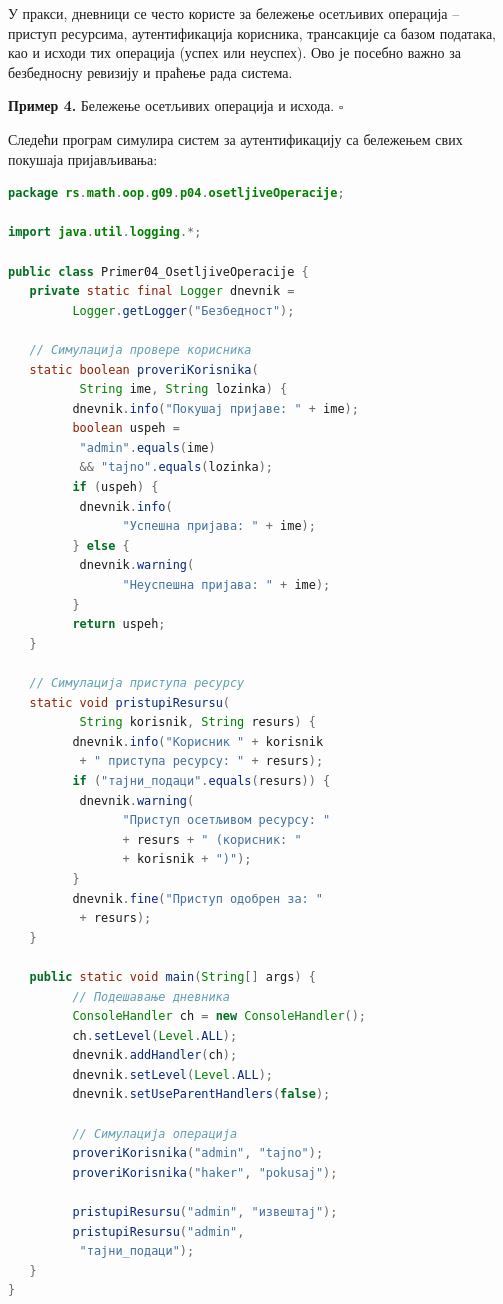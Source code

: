 У пракси, дневници се често користе за бележење осетљивих операција – приступ ресурсима, аутентификација корисника, трансакције са базом података, као и исходи тих операција (успех или неуспех). Ово је посебно важно за безбедносну ревизију и праћење рада система.


\bigskip

\noindent \textbf{Пример 4.} Бележење осетљивих операција и исхода. $\square$

\medskip

Следећи програм симулира систем за аутентификацију са бележењем свих покушаја пријављивања:


\begin{lstlisting}[language=Java]
package rs.math.oop.g09.p04.osetljiveOperacije;
 
import java.util.logging.*;
 
public class Primer04_OsetljiveOperacije {
   private static final Logger dnevnik =
         Logger.getLogger("Безбедност");
 
   // Симулација провере корисника
   static boolean proveriKorisnika(
          String ime, String lozinka) {
         dnevnik.info("Покушај пријаве: " + ime);
         boolean uspeh =
          "admin".equals(ime)
          && "tajno".equals(lozinka);
         if (uspeh) {
          dnevnik.info(
                "Успешна пријава: " + ime);
         } else {
          dnevnik.warning(
                "Неуспешна пријава: " + ime);
         }
         return uspeh;
   }
 
   // Симулација приступа ресурсу
   static void pristupiResursu(
          String korisnik, String resurs) {
         dnevnik.info("Корисник " + korisnik
          + " приступа ресурсу: " + resurs);
         if ("тајни_подаци".equals(resurs)) {
          dnevnik.warning(
                "Приступ осетљивом ресурсу: "
                + resurs + " (корисник: "
                + korisnik + ")");
         }
         dnevnik.fine("Приступ одобрен за: "
          + resurs);
   }
 
   public static void main(String[] args) {
         // Подешавање дневника
         ConsoleHandler ch = new ConsoleHandler();
         ch.setLevel(Level.ALL);
         dnevnik.addHandler(ch);
         dnevnik.setLevel(Level.ALL);
         dnevnik.setUseParentHandlers(false);
 
         // Симулација операција
         proveriKorisnika("admin", "tajno");
         proveriKorisnika("haker", "pokusaj");
 
         pristupiResursu("admin", "извештај");
         pristupiResursu("admin",
          "тајни_подаци");
   }
}
\end{lstlisting}


